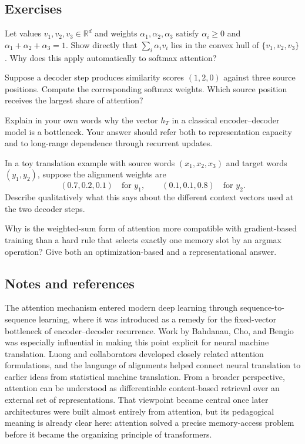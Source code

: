 \subsection*{Exercises}

\begin{exercise}
Let values $v_1,v_2,v_3\in\mathbb{R}^d$ and weights $\alpha_1,\alpha_2,\alpha_3$ satisfy $\alpha_i\ge 0$ and $\alpha_1+\alpha_2+\alpha_3=1$.
Show directly that $\sum_i \alpha_i v_i$ lies in the convex hull of $\{v_1,v_2,v_3\}$.
Why does this apply automatically to softmax attention?
\end{exercise}

\begin{exercise}
Suppose a decoder step produces similarity scores $(1,2,0)$ against three source positions.
Compute the corresponding softmax weights.
Which source position receives the largest share of attention?
\end{exercise}

\begin{exercise}
Explain in your own words why the vector $h_T$ in a classical encoder--decoder model is a bottleneck.
Your answer should refer both to representation capacity and to long-range dependence through recurrent updates.
\end{exercise}

\begin{exercise}
In a toy translation example with source words $(x_1,x_2,x_3)$ and target words $(y_1,y_2)$, suppose the alignment weights are
\[
(0.7,0.2,0.1)\quad\text{for }y_1,
\qquad
(0.1,0.1,0.8)\quad\text{for }y_2.
\]
Describe qualitatively what this says about the different context vectors used at the two decoder steps.
\end{exercise}

\begin{exercise}
Why is the weighted-sum form of attention more compatible with gradient-based training than a hard rule that selects exactly one memory slot by an argmax operation?
Give both an optimization-based and a representational answer.
\end{exercise}

\subsection*{Notes and references}

The attention mechanism entered modern deep learning through sequence-to-sequence learning, where it was introduced as a remedy for the fixed-vector bottleneck of encoder--decoder recurrence.
Work by Bahdanau, Cho, and Bengio was especially influential in making this point explicit for neural machine translation.
Luong and collaborators developed closely related attention formulations, and the language of alignments helped connect neural translation to earlier ideas from statistical machine translation.
From a broader perspective, attention can be understood as differentiable content-based retrieval over an external set of representations.
That viewpoint became central once later architectures were built almost entirely from attention, but its pedagogical meaning is already clear here: attention solved a precise memory-access problem before it became the organizing principle of transformers.
